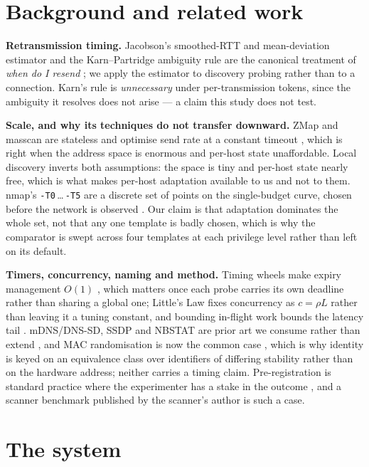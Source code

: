 \documentclass[conference]{IEEEtran}
\begin{document}
\section{Background and related work}

\textbf{Retransmission timing.} Jacobson's smoothed-RTT and mean-deviation
estimator and the Karn--Partridge ambiguity rule are the canonical treatment of
\emph{when do I resend} \cite{jacobson1988,karn1987}; we apply the estimator to
discovery probing rather than to a connection. Karn's rule is
\emph{unnecessary} under per-transmission tokens, since the ambiguity it
resolves does not arise --- a claim this study does not test.

\textbf{Scale, and why its techniques do not transfer downward.} ZMap and
masscan are stateless and optimise send rate at a constant timeout
\cite{zmap2013,masscan}, which is right when the address space is enormous and
per-host state unaffordable. Local discovery inverts both assumptions: the
space is tiny and per-host state nearly free, which is what makes per-host
adaptation available to us and not to them. nmap's
\texttt{-T0}\,\ldots\,\texttt{-T5} are a discrete set of points on the
single-budget curve, chosen before the network is observed \cite{nmapbook}. Our
claim is that adaptation dominates the whole set, not that any one template is
badly chosen, which is why the comparator is swept across four templates at
each privilege level rather than left on its default.

\textbf{Timers, concurrency, naming and method.} Timing wheels make expiry
management $O(1)$ \cite{varghese1987}, which matters once each probe carries
its own deadline rather than sharing a global one; Little's Law fixes
concurrency as $c=\rho L$ rather than leaving it a tuning constant, and
bounding in-flight work bounds the latency tail
\cite{grosvenor2015,marinos2014}. mDNS/DNS-SD, SSDP and NBSTAT are prior art we
consume rather than extend \cite{rfc6762,rfc6763,upnp}, and MAC randomisation
is now the common case \cite{martin2017}, which is why identity is keyed on an
equivalence class over identifiers of differing stability rather than on the
hardware address; neither carries a timing claim. Pre-registration is standard
practice where the experimenter has a stake in the outcome \cite{nosek2018},
and a scanner benchmark published by the scanner's author is such a case.

\section{The system}
\label{sec:system}
\end{document}
